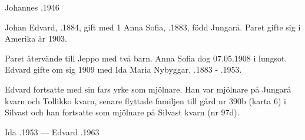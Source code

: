 Johannes .1946


%
Johan Edvard, .1884, gift med 1 Anna Sofia, .1883, född Jungarå. Paret gifte sig i Amerika år 1903.
\begin{jhchildren}
  \item {}
  \item {}
  \item {}
\end{jhchildren}
Paret återvände till Jeppo med två barn. Anna Sofia dog 07.05.1908 i lungsot. Edvard gifte om sig 1909 med Ida Maria Nybyggar, .1883  -	.1953.
\begin{jhchildren}
  \item {}
  \item {}
  \item {}
\end{jhchildren}
Edvard fortsatte med sin fars yrke som mjölnare. Han var mjölnare på Jungarå kvarn och Tollikko kvarn, senare flyttade familjen till gård nr 390b (karta 6) i Silvast och han fortsatte som mjölnare på Silvast kvarn (nr 97d).

Ida .1953  ---  Edvard .1963


